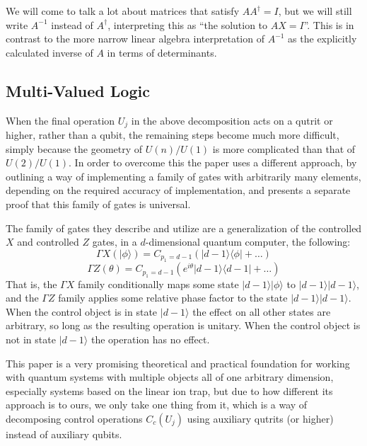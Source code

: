 \documentclass[]{article}
\newcommand{\bra}[1]{\langle #1 |}
\newcommand{\ket}[1]{| #1 \rangle}
\begin{document}
We will come to talk a lot about matrices that satisfy $AA^\dagger = I$, but we will still write $A^{-1}$ instead of $A^\dagger$, interpreting this as ``the solution to $AX = I$''. This is in contrast to the more narrow linear algebra interpretation of $A^{-1}$ as the explicitly calculated inverse of $A$ in terms of determinants.


\subsection{Multi-Valued Logic}
When the final operation $U_j$ in the above decomposition acts on a qutrit or higher, rather than a qubit, the remaining steps become much more difficult, simply because the geometry of $U(n)/U(1)$ is more complicated than that of $U(2)/U(1)$. In order to overcome this the paper \cite{multi-valued-logic} uses a different approach, by outlining a way of implementing a family of gates with arbitrarily many elements, depending on the required accuracy of implementation, and presents a separate proof that this family of gates is universal.

The family of gates they describe and utilize are a generalization of the controlled $X$ and controlled $Z$ gates, in a $d$-dimensional quantum computer, the following:
\[\Gamma X(\ket{\phi}) = C_{p_1 = d-1}(\ket{d-1}\bra{\phi} + \dots)\]
\[\Gamma Z(\theta) = C_{p_1 = d-1}\left(e^{i\theta}\ket{d-1}\bra{d-1} + \dots\right)\]
That is, the $\Gamma X$ family conditionally maps some state $\ket{d-1}\ket{\phi}$ to $\ket{d-1}\ket{d-1}$, and the $\Gamma Z$ family applies some relative phase factor to the state $\ket{d-1}\ket{d-1}$. When the control object is in state $\ket{d-1}$ the effect on all other states are arbitrary, so long as the resulting operation is unitary. When the control object is not in state $\ket{d-1}$ the operation has no effect.

This paper is a very promising theoretical and practical foundation for working with quantum systems with multiple objects all of one arbitrary dimension, especially systems based on the linear ion trap, but due to how different its approach is to ours, we only take one thing from it, which is a way of decomposing control operations $C_c(U_j)$ using auxiliary qutrits (or higher) instead of auxiliary qubits.
\end{document}
